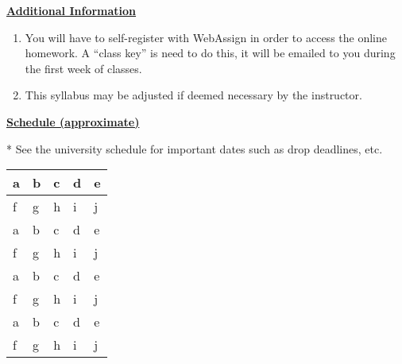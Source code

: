 \documentclass[12pt]{article}
\begin{document}
\underline{\textbf{Additional Information}} \par
\begin{enumerate}
\item You will have to self-register with WebAssign in order to access the online homework.
A “class key” is need to do this, it will be emailed to you during the first week of classes.
\item This syllabus may be adjusted if deemed necessary by the instructor.
\end{enumerate}

\underline{\textbf{Schedule (approximate)}} \par
* See the university schedule for important dates such as drop deadlines, etc.
\begin{longtable}{| p{} | p{} | p{} | p{} | p{} |}
\hline
a & b & c & d & e \\ \hline
f & g & h & i & j \\ \hline
a & b & c & d & e \\ \hline
f & g & h & i & j \\ \hline
a & b & c & d & e \\ \hline
f & g & h & i & j \\ \hline
a & b & c & d & e \\ \hline
f & g & h & i & j \\ \hline
\end{longtable}
\end{document}
